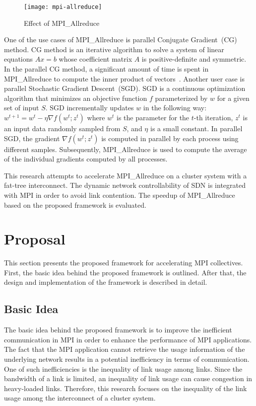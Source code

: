 \begin{figure}
    \centering
    \texttt{[image: mpi-allreduce]}
    \caption{Effect of MPI\_Allreduce}%
    \label{fig:mpi-allreduce}
\end{figure}

One of the use cases of MPI\_Allreduce is parallel Conjugate Gradient~(CG)
method. CG method is an iterative algorithm to solve a system of linear
equations $Ax = b$ whose coefficient matrix $A$ is positive-definite and
symmetric. In the parallel CG method, a significant amount of time is spent in
MPI\_Allreduce to compute the inner product of
vectors~\autocite{Kandalla2012}. Another user case is parallel Stochastic
Gradient Descent~(SGD). SGD is a continuous optimization algorithm that
minimizes an objective function $f$ parameterized by $w$ for a given set of
input $S$. SGD incrementally updates $w$ in the following way: $w^{t+1}=w^t-
\eta \nabla f(w^t; z^t)$ where $w^t$ is the parameter for the $t$-th
iteration, $z^t$ is an input data randomly sampled from $S$, and $\eta$ is a
small constant. In parallel SGD, the gradient $\nabla f(w^t; z^t)$ is computed
in parallel by each process using different samples. Subsequently,
MPI\_Allreduce is used to compute the average of the individual gradients
computed by all processes.

This research attempts to accelerate MPI\_Allreduce on a cluster system with a
fat-tree interconnect. The dynamic network controllability of SDN is
integrated with MPI in order to avoid link contention. The speedup of
MPI\_Allreduce based on the proposed framework is evaluated.

\section{Proposal}\label{sec:iii-proposal}

This section presents the proposed framework for accelerating MPI collectives.
First, the basic idea behind the proposed framework is outlined. After that,
the design and implementation of the framework is described in detail.

\subsection{Basic Idea}

The basic idea behind the proposed framework is to improve the inefficient
communication in MPI in order to enhance the performance of MPI applications.
The fact that the MPI application cannot retrieve the usage information of the
underlying network results in a potential inefficiency in terms of
communication. One of such inefficiencies is the inequality of link usage
among links. Since the bandwidth of a link is limited, an inequality of link
usage can cause congestion in heavy-loaded links. Therefore, this research
focuses on the inequality of the link usage among the interconnect of a
cluster system.

